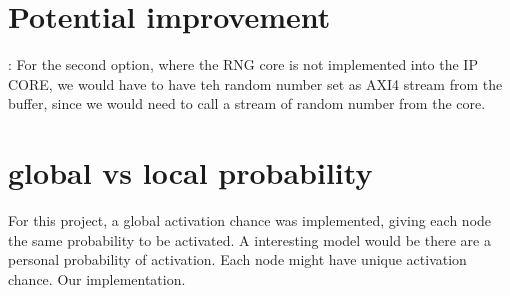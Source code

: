 \section{Potential improvement}:
For the second option, where the RNG core is not implemented into the IP CORE, we would have to have teh random number set as AXI4 stream from the buffer, since we would need to call a stream of random number from the core.


\section{global vs local probability}
For this project, a global activation chance was implemented, giving each node the same probability to be activated. A interesting model would be there are a personal probability of activation. Each node might have unique activation chance. Our implementation. 
